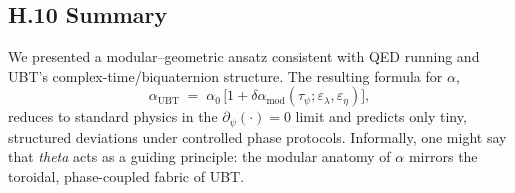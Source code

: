 \subsection*{H.10 Summary}
We presented a modular--geometric ansatz consistent with QED running and UBT's complex-time/biquaternion structure. 
The resulting formula for $\alpha$,
\begin{equation}
\alpha_{\mathrm{UBT}} \;=\; \alpha_0\,\big[ 1 + \delta\alpha_{\mathrm{mod}}(\tau_\psi;\varepsilon_\lambda,\varepsilon_\eta) \big],
\end{equation}
reduces to standard physics in the $\partial_\psi(\cdot)=0$ limit and predicts only tiny, structured deviations under controlled phase protocols.
Informally, one might say that \emph{theta} acts as a guiding principle: the modular anatomy of $\alpha$ mirrors the toroidal, phase-coupled fabric of UBT.
